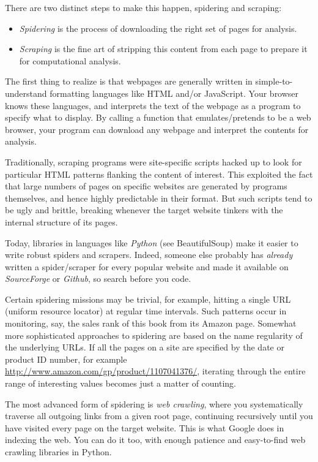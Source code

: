 \documentclass[10pt]{article}
\begin{document}
There are two distinct steps to make this happen, spidering and scraping:

\begin{itemize}
  \item \textit{Spidering} is the process of downloading the right set of pages for analysis.
  \item \textit{Scraping} is the fine art of stripping this content from each page to prepare it for computational analysis.
\end{itemize}

The first thing to realize is that webpages are generally written in simple-to-understand formatting languages like HTML and/or JavaScript. Your browser knows these languages, and interprets the text of the webpage as a program to specify what to display. By calling a function that emulates/pretends to be a web browser, your program can download any webpage and interpret the contents for analysis.

Traditionally, scraping programs were site-specific scripts hacked up to look for particular HTML patterns flanking the content of interest. This exploited the fact that large numbers of pages on specific websites are generated by programs themselves, and hence highly predictable in their format. But such scripts tend to be ugly and brittle, breaking whenever the target website tinkers with the internal structure of its pages.

Today, libraries in languages like \textit{Python} (see BeautifulSoup) make it easier to write robust spiders and scrapers. Indeed, someone else probably has \textit{already} written a spider/scraper for every popular website and made it available on \textit{SourceForge} or \textit{Github}, so search before you code.

Certain spidering missions may be trivial, for example, hitting a single URL (uniform resource locator) at regular time intervals. Such patterns occur in monitoring, say, the sales rank of this book from its Amazon page. Somewhat more sophisticated approaches to spidering are based on the name regularity of the underlying URLs. If all the pages on a site are specified by the date or product ID number, for example \href{http://www.amazon.com/gp/product/1107041376/}{http://www.amazon.com/gp/product/1107041376/}, iterating through the entire range of interesting values becomes just a matter of counting.

The most advanced form of spidering is \textit{web crawling}, where you systematically traverse all outgoing links from a given root page, continuing recursively until you have visited every page on the target website. This is what Google does in indexing the web. You can do it too, with enough patience and easy-to-find web crawling libraries in Python.
\end{document}

